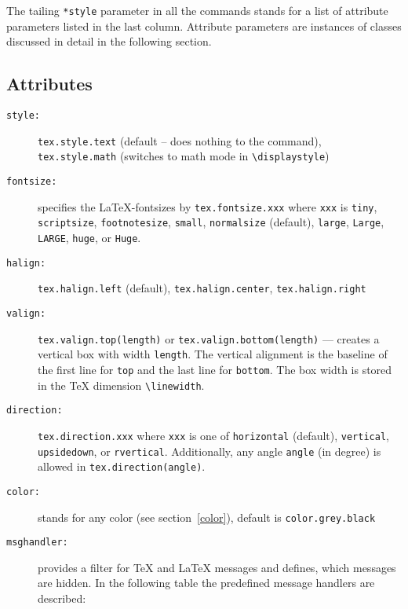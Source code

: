 The tailing \verb|*style| parameter in all the commands stands for a
list of attribute parameters listed in the last column. Attribute
parameters are instances of classes discussed in detail in the following
section.

\subsection{Attributes}
\begin{description}
\item[\texttt{style:}] \verb|tex.style.text| (default -- does nothing to
the command),\\\verb|tex.style.math| (switches to math mode in
\verb|\displaystyle|)
\item[\texttt{fontsize:}] specifies the \LaTeX-fontsizes by
\verb|tex.fontsize.xxx| where \verb|xxx| is
\verb|tiny|,
\verb|scriptsize|,
\verb|footnotesize|,
\verb|small|,
\verb|normalsize| (default),
\verb|large|,
\verb|Large|,
\verb|LARGE|,
\verb|huge|, or
\verb|Huge|.
\item[\texttt{halign:}] \verb|tex.halign.left| (default),
\verb|tex.halign.center|, \verb|tex.halign.right|
\item[\texttt{valign:}] \verb|tex.valign.top(length)| or
\verb|tex.valign.bottom(length)| --- creates a vertical box with width
\verb|length|. The vertical alignment is the baseline of the first line
for \verb|top| and the last line for \verb|bottom|. The box width is
stored in the \TeX{} dimension \verb|\linewidth|.
\item[\texttt{direction:}] \verb|tex.direction.xxx| where \verb|xxx| is
one of \verb|horizontal| (default), \verb|vertical|, \verb|upsidedown|,
or \verb|rvertical|. Additionally, any angle \verb|angle| (in degree) is
allowed in \verb|tex.direction(angle)|.
\item[\texttt{color:}] stands for any \PyX{} color (see
section~\ref{color}), default is \verb|color.grey.black|
\item[\texttt{msghandler:}] provides a filter for \TeX{} and \LaTeX{}
messages and defines, which messages are hidden. In the following table
the predefined message handlers are described:


\end{description}
